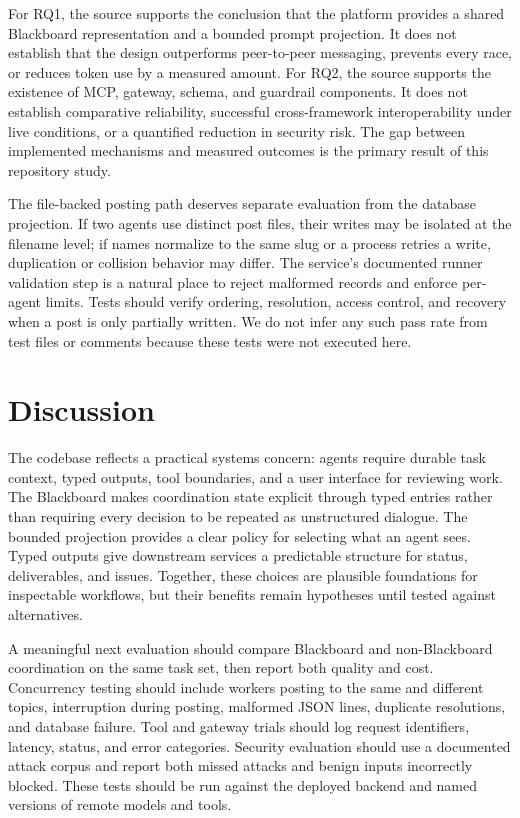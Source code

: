 \documentclass[12pt,onecolumn,draftclsnofoot]{IEEEtran}
\begin{document}
For RQ1, the source supports the conclusion that the platform provides a shared Blackboard representation and a bounded prompt projection. It does not establish that the design outperforms peer-to-peer messaging, prevents every race, or reduces token use by a measured amount. For RQ2, the source supports the existence of MCP, gateway, schema, and guardrail components. It does not establish comparative reliability, successful cross-framework interoperability under live conditions, or a quantified reduction in security risk. The gap between implemented mechanisms and measured outcomes is the primary result of this repository study.

The file-backed posting path deserves separate evaluation from the database projection. If two agents use distinct post files, their writes may be isolated at the filename level; if names normalize to the same slug or a process retries a write, duplication or collision behavior may differ. The service's documented runner validation step is a natural place to reject malformed records and enforce per-agent limits. Tests should verify ordering, resolution, access control, and recovery when a post is only partially written. We do not infer any such pass rate from test files or comments because these tests were not executed here.

\section{Discussion}
The codebase reflects a practical systems concern: agents require durable task context, typed outputs, tool boundaries, and a user interface for reviewing work. The Blackboard makes coordination state explicit through typed entries rather than requiring every decision to be repeated as unstructured dialogue. The bounded projection provides a clear policy for selecting what an agent sees. Typed outputs give downstream services a predictable structure for status, deliverables, and issues. Together, these choices are plausible foundations for inspectable workflows, but their benefits remain hypotheses until tested against alternatives.

A meaningful next evaluation should compare Blackboard and non-Blackboard coordination on the same task set, then report both quality and cost. Concurrency testing should include workers posting to the same and different topics, interruption during posting, malformed JSON lines, duplicate resolutions, and database failure. Tool and gateway trials should log request identifiers, latency, status, and error categories. Security evaluation should use a documented attack corpus and report both missed attacks and benign inputs incorrectly blocked. These tests should be run against the deployed backend and named versions of remote models and tools.
\end{document}
